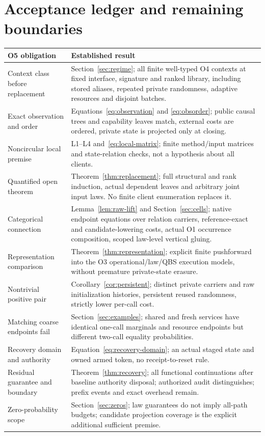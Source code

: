\documentclass[11pt,a4paper]{article}
\theoremstyle{definition}
\begin{document}
\section{Acceptance ledger and remaining boundaries}\label{sec:acceptance}
\begin{longtable}{@{}p{}p{}@{}}
\toprule
O5 obligation&Established result\\
\midrule
\endhead
Context class before replacement&Section~\ref{sec:regime}; all finite
well-typed O4 contexts at fixed interface, signature and ranked library,
including stored aliases, repeated private randomness, adaptive resources
and disjoint batches.\\
Exact observation and order&Equations~\eqref{eq:observation} and
\eqref{eq:obsorder}; public causal trees and capability leaves match,
external costs are ordered, private state is projected only at closing.\\
Noncircular local premise&L1--L4 and~\eqref{eq:local-matrix}; finite
method/input matrices and state-relation checks, not a hypothesis about
all clients.\\
Quantified open theorem&Theorem~\ref{thm:replacement}; full structural
and rank induction, actual dependent leaves and arbitrary joint input
laws. No finite client enumeration replaces it.\\
Categorical connection&Lemma~\ref{lem:raw-lift} and
Section~\ref{sec:cells}; native endpoint equations over relation carriers,
reference-exact and candidate-lowering costs, actual O1 occurrence
composition, scoped law-level vertical gluing.\\
Representation comparison&Theorem~\ref{thm:representation}; explicit
finite pushforward into the O3 operational/law/QBS execution models,
without premature private-state erasure.\\
Nontrivial positive pair&Corollary~\ref{cor:persistent}; distinct private
carriers and raw initialization histories, persistent reused randomness,
strictly lower per-call cost.\\
Matching coarse endpoints fail&Section~\ref{sec:examples}; shared and
fresh services have identical one-call marginals and resource endpoints
but different two-call equality probabilities.\\
Recovery domain and authority&Equation~\eqref{eq:recovery-domain}; an
actual staged state and owned armed token, no receipt-to-reset rule.\\
Residual guarantee and boundary&Theorem~\ref{thm:recovery}; all functional
continuations after baseline authority disposal; authorized audit
distinguishes; prefix events and exact overhead remain.\\
Zero-probability scope&Section~\ref{sec:zeros}; law guarantees do not
imply all-path budgets; candidate projection coverage is the explicit
additional sufficient premise.\\
\bottomrule
\end{longtable}
\end{document}
